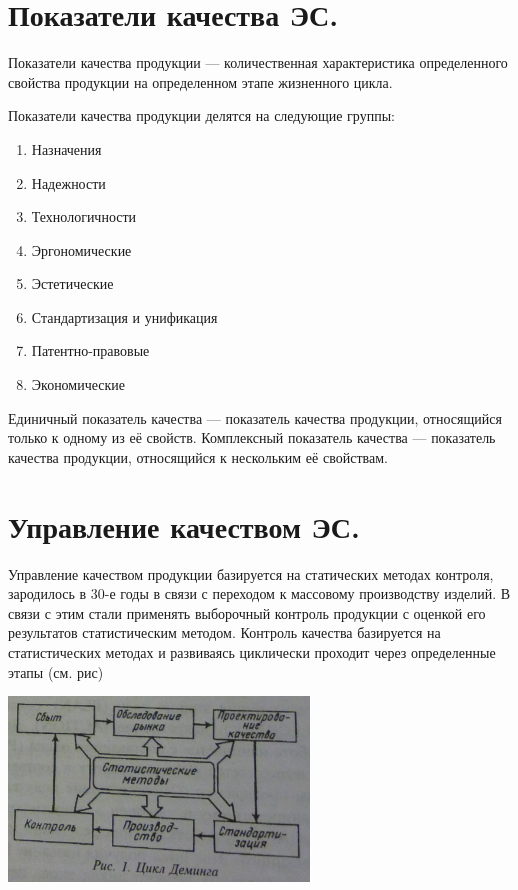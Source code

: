 \documentclass[unicode, 12pt, a4paper, oneside]{article}
\begin{document}
\section{Показатели качества ЭС.}

Показатели качества продукции --- количественная характеристика определенного свойства продукции на определенном этапе жизненного цикла.

Показатели качества продукции делятся на следующие группы:
\begin{enumerate}
\item Назначения
\item Надежности
\item Технологичности
\item Эргономические
\item Эстетические
\item Стандартизация и унификация
\item Патентно-правовые
\item Экономические
\end{enumerate}

Единичный показатель качества --- показатель качества продукции, относящийся только к одному из её свойств. Комплексный показатель качества --- показатель качества продукции, относящийся к нескольким её свойствам.

\section{Управление качеством ЭС.}

Управление качеством продукции базируется на статических методах контроля, зародилось в 30-е годы в связи с переходом к массовому производству изделий. В связи с этим стали применять выборочный контроль продукции с оценкой его результатов статистическим методом.
Контроль качества базируется на статистических методах и развиваясь циклически проходит через определенные этапы (см. рис)
\begin{center} 
\includegraphics[width=0.6\textwidth]{32_Demming.png}\\
\end{center}
\end{document}
